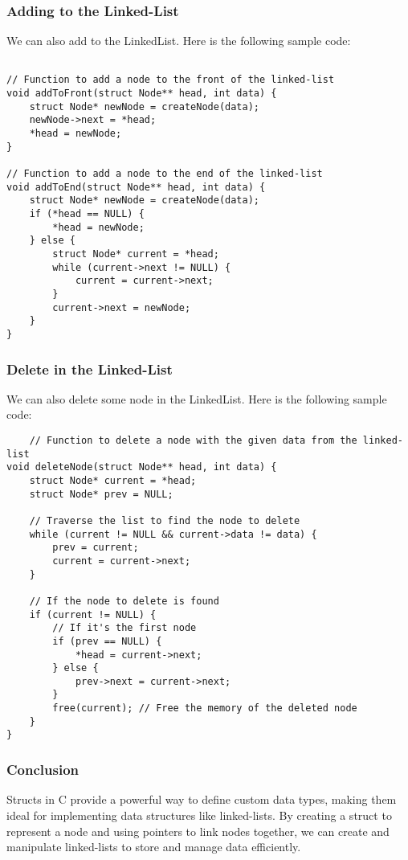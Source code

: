 \documentclass{article}
\begin{document}
\subsubsection{Adding to the Linked-List}
We can also add to the LinkedList. Here is the following sample code:
\begin{verbatim}
    
// Function to add a node to the front of the linked-list
void addToFront(struct Node** head, int data) {
    struct Node* newNode = createNode(data);
    newNode->next = *head;
    *head = newNode;
}

// Function to add a node to the end of the linked-list
void addToEnd(struct Node** head, int data) {
    struct Node* newNode = createNode(data);
    if (*head == NULL) {
        *head = newNode;
    } else {
        struct Node* current = *head;
        while (current->next != NULL) {
            current = current->next;
        }
        current->next = newNode;
    }
}
\end{verbatim}

\subsubsection{Delete in the Linked-List}
We can also delete some node in the LinkedList. Here is the following sample code:
\begin{verbatim}
    // Function to delete a node with the given data from the linked-list
void deleteNode(struct Node** head, int data) {
    struct Node* current = *head;
    struct Node* prev = NULL;

    // Traverse the list to find the node to delete
    while (current != NULL && current->data != data) {
        prev = current;
        current = current->next;
    }

    // If the node to delete is found
    if (current != NULL) {
        // If it's the first node
        if (prev == NULL) {
            *head = current->next;
        } else {
            prev->next = current->next;
        }
        free(current); // Free the memory of the deleted node
    }
}
\end{verbatim}

\subsubsection{Conclusion}
Structs in C provide a powerful way to define custom data types, making them ideal for implementing data structures like linked-lists. By creating a struct to represent a node and using pointers to link nodes together, we can create and manipulate linked-lists to store and manage data efficiently.
\end{document}
